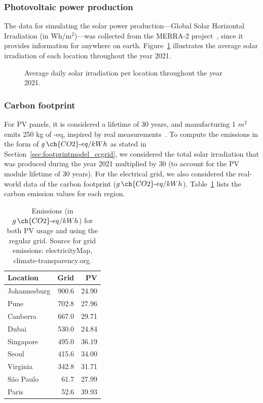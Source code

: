 \subsubsection{Photovoltaic power production}

The data for simulating the solar power production---Global Solar Horizontal Irradiation (in Wh/m$^{2}$)---was collected from the MERRA-2 project~\cite{GELARO2017MERRA2}, since it provides information for anywhere on earth. Figure~\ref{fig:pv_ghi} illustrates the average solar irradiation of each location throughout the year 2021.

 \begin{figure}[h]
  \centering
   {}
  \caption{Average daily solar irradiation per location throughout the year 2021.}
  \label{fig:pv_ghi}
\end{figure}

\subsubsection{Carbon footprint}

For PV panels, it is considered a lifetime of 30 years, and manufacturing 1 $m^2$ emits 250 kg of -eq, inspired by real measurements~\cite{YUE2014pv_carbon}. To compute the emissions in the form of $g\,\ch{CO2}\text{-}eq/kWh$ as stated in Section~\ref{sec:footprintmodel_ccgrid}, we considered the total solar irradiation that was produced during the year 2021 multiplied by 30 (to account for the PV module lifetime of 30 years). For the electrical grid, we also considered the real-world data of the carbon footprint ($g\,\ch{CO2}\text{-}eq/kWh$). Table~\ref{tab:carbonfootprint} lists the carbon emission values for each region.

\begin{table}[h]

  \caption{Emissions (in $g\,\ch{CO2}\text{-}eq/kWh$) for both PV usage and using the regular grid. Source for grid emissions: electricityMap, climate-transparency.org.}\label{tab:carbonfootprint} \centering
  \begin{tabular}{|l|r|r|}
    
  \hline
    
  \textbf{Location} &  \textbf{Grid} & \textbf{PV} \\
  \hline
  Johannesburg & 900.6 & 24.90 \\
  \hline
  Pune & 702.8 & 27.96 \\
  \hline
  Canberra & 667.0 & 29.71 \\
  \hline
  Dubai & 530.0  & 24.84 \\
  \hline
  Singapore & 495.0 & 36.19 \\
  \hline     
  Seoul & 415.6 & 34.00 \\
  \hline
  Virginia  & 342.8 & 31.71 \\
  \hline
  São Paulo &  61.7 & 27.99\\
  \hline 
  Paris &  52.6  & 39.93 \\
  \hline  

\end{tabular}  
\end{table}


